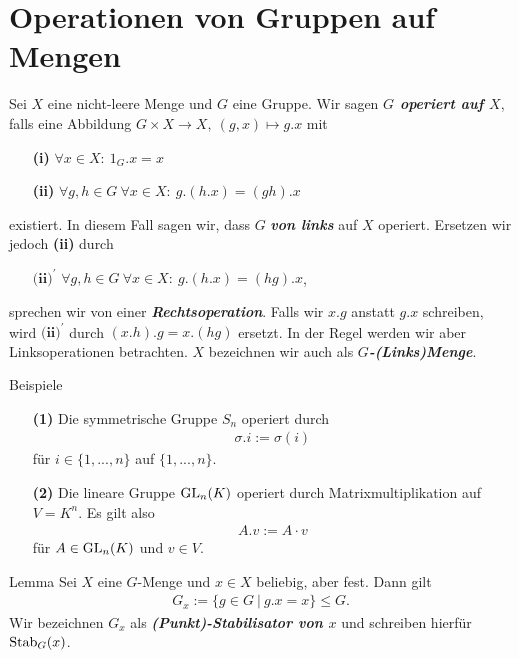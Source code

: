 \section{Operationen von Gruppen auf Mengen}

\begin{df}\label{skript:2.1} 
Sei $X $ eine nicht-leere Menge und $G$ eine Gruppe.
Wir sagen \textbf{\textit{$G$ operiert auf $X$}},
falls eine Abbildung  $G \times X \to X, \ (g,x) \mapsto g.x$
mit
\begin{enumerate}
\item[\textbf{(i)}] $\forall x \in X: \ 1_G.x=x$
\item[\textbf{(ii)}] $\forall g,h \in G \ \forall x \in X: \ g.(h.x)=(gh).x $
\end{enumerate}
existiert. In diesem Fall sagen wir, dass $G$ \textbf{\textit{von links}} auf $X$ operiert.
Ersetzen wir jedoch \textbf{(ii)} durch
\begin{enumerate}
\item[$\textbf{(ii)}^\prime$] $\forall g,h \in G \ \forall x \in X: \ g.(h.x) = (hg).x$,
\end{enumerate}
sprechen wir von einer \textbf{\textit{Rechtsoperation}}.
Falls wir $x.g$ anstatt $g.x$ schreiben, wird $\textbf{(ii)}^\prime  $ durch $(x.h).g = x.(hg)$ ersetzt.
In der Regel werden wir aber Linksoperationen betrachten.
$X$ bezeichnen wir auch als \textbf{\textit{$G$-(Links)Menge}}.
\end{df}

\begin{genericdf}{Beispiele}\label{2.2} \
\begin{enumerate}
\item[\textbf{(1)}]
Die symmetrische Gruppe $S_n$ operiert durch
\begin{align*}
\sigma.i := \sigma(i)
\end{align*}
für $i \in \lbrace 1,...,n \rbrace$ auf $\lbrace 1,...,n \rbrace$.
\item[\textbf{(2)}]
Die lineare Gruppe $\operatorname{GL}_n(K)$ operiert durch Matrixmultiplikation auf $V= K^n$.
Es gilt also 
\begin{align*}
A.v := A \cdot v
\end{align*}
für $A \in \operatorname{GL}_n(K)$ und $v \in V$.
\end{enumerate}

\end{genericdf}

\begin{genericthm}{Lemma}\label{2.3} 
Sei $X$ eine $G$-Menge und $x \in X$ beliebig, aber fest.
Dann gilt
\begin{align*}
G_x := \lbrace g \in G \ | \ g.x=x \rbrace \leq G.
\end{align*}
Wir bezeichnen $G_x$ als \textbf{\textit{(Punkt)-Stabilisator von $x$}} und schreiben hierfür $\operatorname{Stab}_G(x)$.
\end{genericthm}

